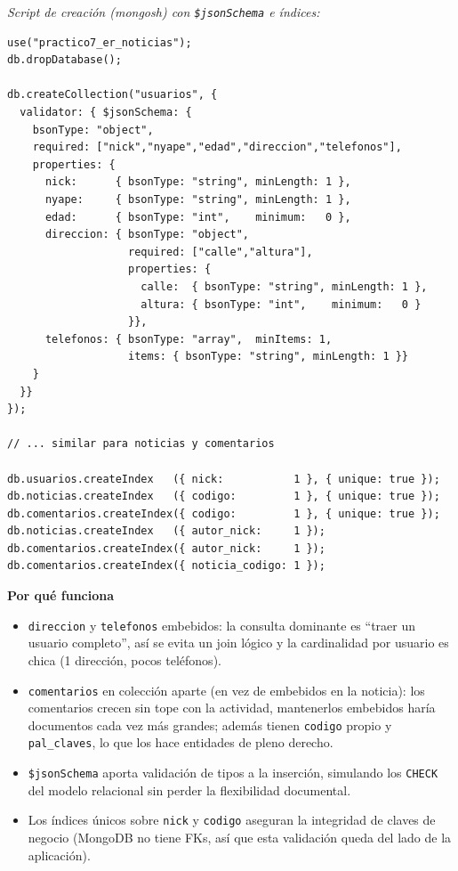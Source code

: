 \documentclass[11pt,a4paper]{article}
\newcommand{\itemcabecera}[1]{\noindent\textbf{#1}\par\medskip}
\newcommand{\bloquePorque}{\itemcabecera{Por qu\'e funciona}}
\begin{document}
\textit{Script de creación (mongosh) con \texttt{\$jsonSchema} e índices:}

\begin{lstlisting}
use("practico7_er_noticias");
db.dropDatabase();

db.createCollection("usuarios", {
  validator: { $jsonSchema: {
    bsonType: "object",
    required: ["nick","nyape","edad","direccion","telefonos"],
    properties: {
      nick:      { bsonType: "string", minLength: 1 },
      nyape:     { bsonType: "string", minLength: 1 },
      edad:      { bsonType: "int",    minimum:   0 },
      direccion: { bsonType: "object",
                   required: ["calle","altura"],
                   properties: {
                     calle:  { bsonType: "string", minLength: 1 },
                     altura: { bsonType: "int",    minimum:   0 }
                   }},
      telefonos: { bsonType: "array",  minItems: 1,
                   items: { bsonType: "string", minLength: 1 }}
    }
  }}
});

// ... similar para noticias y comentarios

db.usuarios.createIndex   ({ nick:           1 }, { unique: true });
db.noticias.createIndex   ({ codigo:         1 }, { unique: true });
db.comentarios.createIndex({ codigo:         1 }, { unique: true });
db.noticias.createIndex   ({ autor_nick:     1 });
db.comentarios.createIndex({ autor_nick:     1 });
db.comentarios.createIndex({ noticia_codigo: 1 });
\end{lstlisting}

\bloquePorque

\begin{itemize}
    \item \texttt{direccion} y \texttt{telefonos} embebidos: la consulta dominante es ``traer un usuario completo'', así se evita un join lógico y la cardinalidad por usuario es chica (1 dirección, pocos teléfonos).
    \item \texttt{comentarios} en colección aparte (en vez de embebidos en la noticia): los comentarios crecen sin tope con la actividad, mantenerlos embebidos haría documentos cada vez más grandes; además tienen \texttt{codigo} propio y \texttt{pal\_claves}, lo que los hace entidades de pleno derecho.
    \item \texttt{\$jsonSchema} aporta validación de tipos a la inserción, simulando los \texttt{CHECK} del modelo relacional sin perder la flexibilidad documental.
    \item Los índices únicos sobre \texttt{nick} y \texttt{codigo} aseguran la integridad de claves de negocio (MongoDB no tiene FKs, así que esta validación queda del lado de la aplicación).
\end{itemize}
\end{document}
